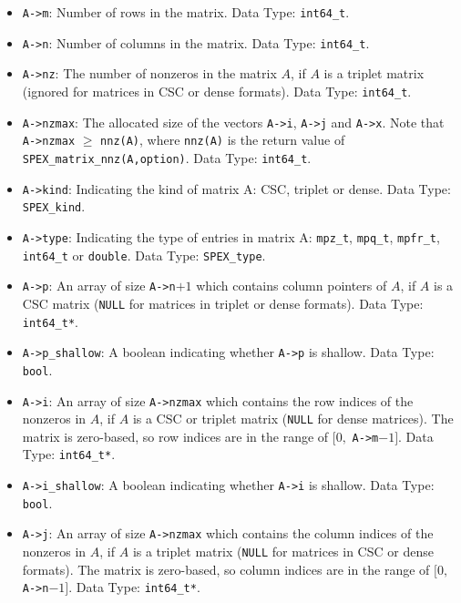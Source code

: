 \documentclass[12pt]{report}
\theoremstyle{definition}
\begin{document}
\begin{itemize}
\item \verb|A->m|: Number of rows in the matrix. Data Type: \verb|int64_t|.

\item \verb|A->n|: Number of columns in the matrix. Data Type: \verb|int64_t|.

\item \verb|A->nz|: The number of nonzeros in the matrix $A$, if $A$ is
a triplet matrix (ignored for matrices in CSC or dense formats). Data Type:
\verb|int64_t|.

\item \verb|A->nzmax|: The allocated size of the vectors \verb|A->i|,
\verb|A->j| and \verb|A->x|. Note that \verb|A->nzmax| $\geq$ \verb|nnz(A)|,
where \verb|nnz(A)| is the return value of \verb|SPEX_matrix_nnz(A,option)|.
Data Type: \verb|int64_t|.

\item \verb|A->kind|: Indicating the kind of matrix A: CSC, triplet or dense.
Data Type: \verb|SPEX_kind|.

\item \verb|A->type|: Indicating the type of entries in matrix A: \verb|mpz_t|,
\verb|mpq_t|, \verb|mpfr_t|, \verb|int64_t| or \verb|double|.
Data Type: \verb|SPEX_type|.

\item \verb|A->p|: An array of size \verb|A->n|$+1$ which contains column pointers
of $A$, if $A$ is a CSC matrix (\verb|NULL| for matrices in triplet or dense
formats). Data Type: \verb|int64_t*|.

\item \verb|A->p_shallow|: A boolean indicating whether \verb|A->p| is shallow.
Data Type: \verb|bool|.

\item \verb|A->i|: An array of size \verb|A->nzmax| which contains the row
indices of the nonzeros in $A$, if $A$ is a CSC or triplet matrix (\verb|NULL|
for dense matrices). The matrix is zero-based, so row indices are
in the range of $[0,$ \verb|A->m|$-1]$. Data Type: \verb|int64_t*|.

\item \verb|A->i_shallow|: A boolean indicating whether \verb|A->i| is shallow.
Data Type: \verb|bool|.

\item \verb|A->j|: An array of size \verb|A->nzmax| which contains the column
indices of the nonzeros in $A$, if $A$ is a triplet matrix (\verb|NULL| for
matrices in CSC or dense formats).
The matrix is zero-based, so column indices are
in the range of $[0,$ \verb|A->n|$-1]$. Data Type: \verb|int64_t*|.


\end{itemize}
\end{document}
